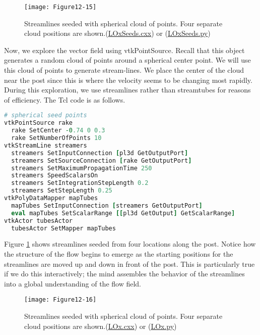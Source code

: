 \begin{figure}[!htb]
	\centering
	\texttt{[image: Figure12-15]}
	\caption{Streamlines seeded with spherical cloud of points. Four separate cloud positions are shown.(\href{https://lorensen.github.io/VTKExamples/site/Cxx/VisualizationAlgorithms/LOxSeeds/}{LOxSeeds.cxx}) or (\href{https://lorensen.github.io/VTKExamples/site/Python/VisualizationAlgorithms/LOxSeeds/}{LOxSeeds.py})}
	\label{fig:Figure12-15}
\end{figure}


Now, we explore the vector field using vtkPointSource.
Recall that this object generates a random cloud of points around a spherical center point.
We will use this cloud of points to generate stream-lines.
We place the center of the cloud near the post since this is where the velocity seems to be changing most rapidly.
During this exploration, we use streamlines rather than streamtubes for reasons of efficiency.
The Tcl code is as follows.

\begin{lstlisting}[language=TCL, caption={Explore the vector field using a point source.}]
# spherical seed points
vtkPointSource rake
  rake SetCenter -0.74 0 0.3
  rake SetNumberOfPoints 10
vtkStreamLine streamers
  streamers SetInputConnection [pl3d GetOutputPort]
  streamers SetSourceConnection [rake GetOutputPort]
  streamers SetMaximumPropagationTime 250
  streamers SpeedScalarsOn
  streamers SetIntegrationStepLength 0.2
  streamers SetStepLength 0.25
vtkPolyDataMapper mapTubes
  mapTubes SetInputConnection [streamers GetOutputPort]
  eval mapTubes SetScalarRange [[pl3d GetOutput] GetScalarRange]
vtkActor tubesActor
  tubesActor SetMapper mapTubes
\end{lstlisting}

Figure \ref{fig:Figure12-15} shows streamlines seeded from four locations along the post.
Notice how the structure of the flow begins to emerge as the starting positions for the streamlines are moved up and down in front of the post.
This is particularly true if we do this interactively; the mind assembles the behavior of the streamlines into a global understanding of the flow field.

\begin{figure}[!htb]
	\centering
	\texttt{[image: Figure12-16]}
	\caption{Streamlines seeded with spherical cloud of points. Four separate cloud positions are shown.(\href{https://lorensen.github.io/VTKExamples/site/Cxx/VisualizationAlgorithms/LOx/}{LOx.cxx}) or (\href{https://lorensen.github.io/VTKExamples/site/Python/VisualizationAlgorithms/LOx/}{LOx.py})}
	\label{fig:Figure12-16}
\end{figure}

